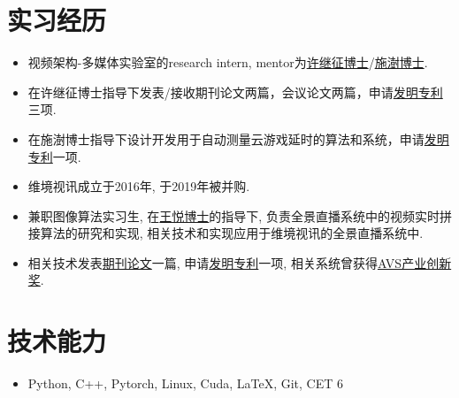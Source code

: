 \documentclass{resume}
\begin{document}
\section{实习经历}
\begin{itemize}
   \item 视频架构-多媒体实验室的research intern, mentor为\href{https://scholar.google.com/citations?user=x4iWZ7wAAAAJ&hl=en}{许继征博士}/\href{https://scholar.google.com/citations?hl=en&user=RQD_dqYAAAAJ}{施澍博士}.
  \item 在许继征博士指导下发表/接收期刊论文两篇，会议论文两篇，申请\href{http://www.soopat.com/Home/Result?Sort=&View=&Columns=&Valid=&Embed=&Db=&Ids=&FolderIds=&FolderId=&ImportPatentIndex=&Filter=&SearchWord=%E9%BB%8E%E5%90%89%E5%9B%BD&FMZL=Y&SYXX=Y&WGZL=Y&FMSQ=Y}{发明专利}三项.
  \item 在施澍博士指导下设计开发用于自动测量云游戏延时的算法和系统，申请\href{http://www.soopat.com/Patent/202110172567}{发明专利}一项.
\end{itemize}

\begin{itemize}
  \item 维境视讯成立于2016年, 于2019年被并购.
  \item 兼职图像算法实习生, 在\href{https://dblp.uni-trier.de/pid/33/4822-32.html}{王悦博士}的指导下, 负责全景直播系统中的视频实时拼接算法的研究和实现, 相关技术和实现应用于维境视讯的全景直播系统中.
  \item 相关技术发表\href{https://kns.cnki.net/kcms/detail/detail.aspx?dbcode=CJFD&dbname=CJFDLAST2018&filename=PZKX201803003&v=tPaKZsLxkg0cUv5TgA0vLc%25mmd2B%25mmd2FYm0D6CGdqsd20qB21aAFkQVtxA1pTOQHC3je4lKJ}{期刊论文}一篇, 申请\href{http://www.soopat.com/Patent/201711100069}{发明专利}一项, 相关系统曾获得\href{http://www.avs.org.cn/avs_award/2017.asp}{AVS产业创新奖}.
\end{itemize}

\section{技术能力}
\begin{itemize}[parsep=0.2ex]
  \item Python, C++, Pytorch, Linux, Cuda, \LaTeX, Git, CET 6
\end{itemize}
\end{document}
